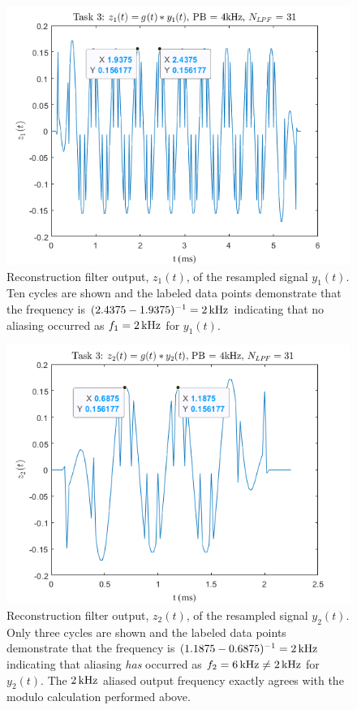 \documentclass[a4paper,12pt]{article}
\newcommand{\Hz}[1]{%
    \ifcase#1
        \relax
    \or
        \,\text{Hz}
    \or
        \,\text{kHz}
    \or
        \,\text{MHz}
    \or
        \,\text{GHz}
    \else
        \,\text{Invalid}
    \fi
}
\begin{document}
\begin{figure}[!h]
    \centering
    \includegraphics[width=1\textwidth]{T3a.png}
    \captionsetup{justification=centering}
    \caption{\small Reconstruction filter output, $z_1(t)$, of the resampled signal $y_1(t)$. Ten cycles are shown and the labeled data points demonstrate that the frequency is $(2.4375 - 1.9375)^{-1} = 2\Hz{2}$ indicating that no aliasing occurred as $f_1 = 2\Hz{2}$ for $y_1(t)$.}
    \label{T3a}
\end{figure}

\begin{figure}[!t]
    \centering
    \includegraphics[width=1\textwidth]{T3b.png}
    \captionsetup{justification=centering}
    \caption{\small Reconstruction filter output, $z_2(t)$, of the resampled signal $y_2(t)$. Only three cycles are shown and the labeled data points demonstrate that the frequency is $(1.1875 - 0.6875)^{-1} = 2\Hz{2}$ indicating that aliasing \textit{has} occurred as $f_2 = 6\Hz{2} \neq 2\Hz{2}$ for $y_2(t)$. The $2\Hz{2}$ aliased output frequency exactly agrees with the modulo calculation performed above.}
    \label{T3b}
\end{figure}
\end{document}
